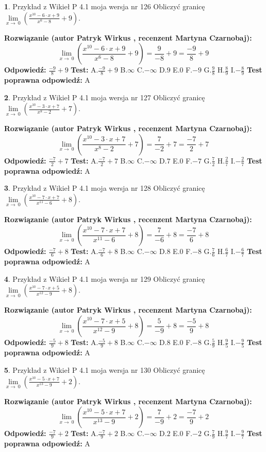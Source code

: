 \documentclass[12pt, a4paper]{article}
\theoremstyle{definition} %
\newtheorem{zad}{}
\newcommand{\zadStart}[1]{\begin{zad}#1\newline}
\newcommand{\zadStop}{\end{zad}}
\newcommand{\rozwStart}[2]{\noindent \textbf{Rozwiązanie (autor #1 , recenzent #2): }\newline}
\newcommand{\rozwStop}{\newline}
\newcommand{\odpStart}{\noindent \textbf{Odpowiedź:}\newline}
\newcommand{\odpStop}{\newline}
\newcommand{\testStart}{\noindent \textbf{Test:}\newline}
\newcommand{\testStop}{\newline}
\newcommand{\kluczStart}{\noindent \textbf{Test poprawna odpowiedź:}\newline}
\newcommand{\kluczStop}{\newline}
\begin{document}
\zadStart{Przykład z Wikieł P 4.1 moja wersja nr 126}
Obliczyć granicę $\lim\limits_{x\to\ 0}(\frac{x^{10}-6 \cdot x +9}{x^{6}-8}+9)$.
\zadStop
\rozwStart{Patryk Wirkus}{Martyna Czarnobaj}
$$\lim\limits_{x\to\ 0}(\frac{x^{10}-6 \cdot x +9}{x^{6}-8}+9)=\frac{9}{-8}+9=\frac{-9}{8}+9$$
\rozwStop
\odpStart
$\frac{-9}{8}+9$
\odpStop
\testStart
A.$\frac{-9}{8}+9$
B.$\infty$
C.$-\infty$
D.$9$
E.$0$
F.$-9$
G.$\frac{9}{8}$
H.$\frac{8}{9}$
I.$-\frac{8}{9}$
\testStop
\kluczStart
A
\kluczStop



\zadStart{Przykład z Wikieł P 4.1 moja wersja nr 127}
Obliczyć granicę $\lim\limits_{x\to\ 0}(\frac{x^{10}-3 \cdot x +7}{x^{8}-2}+7)$.
\zadStop
\rozwStart{Patryk Wirkus}{Martyna Czarnobaj}
$$\lim\limits_{x\to\ 0}(\frac{x^{10}-3 \cdot x +7}{x^{8}-2}+7)=\frac{7}{-2}+7=\frac{-7}{2}+7$$
\rozwStop
\odpStart
$\frac{-7}{2}+7$
\odpStop
\testStart
A.$\frac{-7}{2}+7$
B.$\infty$
C.$-\infty$
D.$7$
E.$0$
F.$-7$
G.$\frac{7}{2}$
H.$\frac{2}{7}$
I.$-\frac{2}{7}$
\testStop
\kluczStart
A
\kluczStop



\zadStart{Przykład z Wikieł P 4.1 moja wersja nr 128}
Obliczyć granicę $\lim\limits_{x\to\ 0}(\frac{x^{10}-7 \cdot x +7}{x^{11}-6}+8)$.
\zadStop
\rozwStart{Patryk Wirkus}{Martyna Czarnobaj}
$$\lim\limits_{x\to\ 0}(\frac{x^{10}-7 \cdot x +7}{x^{11}-6}+8)=\frac{7}{-6}+8=\frac{-7}{6}+8$$
\rozwStop
\odpStart
$\frac{-7}{6}+8$
\odpStop
\testStart
A.$\frac{-7}{6}+8$
B.$\infty$
C.$-\infty$
D.$8$
E.$0$
F.$-8$
G.$\frac{7}{6}$
H.$\frac{6}{7}$
I.$-\frac{6}{7}$
\testStop
\kluczStart
A
\kluczStop



\zadStart{Przykład z Wikieł P 4.1 moja wersja nr 129}
Obliczyć granicę $\lim\limits_{x\to\ 0}(\frac{x^{10}-7 \cdot x +5}{x^{12}-9}+8)$.
\zadStop
\rozwStart{Patryk Wirkus}{Martyna Czarnobaj}
$$\lim\limits_{x\to\ 0}(\frac{x^{10}-7 \cdot x +5}{x^{12}-9}+8)=\frac{5}{-9}+8=\frac{-5}{9}+8$$
\rozwStop
\odpStart
$\frac{-5}{9}+8$
\odpStop
\testStart
A.$\frac{-5}{9}+8$
B.$\infty$
C.$-\infty$
D.$8$
E.$0$
F.$-8$
G.$\frac{5}{9}$
H.$\frac{9}{5}$
I.$-\frac{9}{5}$
\testStop
\kluczStart
A
\kluczStop



\zadStart{Przykład z Wikieł P 4.1 moja wersja nr 130}
Obliczyć granicę $\lim\limits_{x\to\ 0}(\frac{x^{10}-5 \cdot x +7}{x^{13}-9}+2)$.
\zadStop
\rozwStart{Patryk Wirkus}{Martyna Czarnobaj}
$$\lim\limits_{x\to\ 0}(\frac{x^{10}-5 \cdot x +7}{x^{13}-9}+2)=\frac{7}{-9}+2=\frac{-7}{9}+2$$
\rozwStop
\odpStart
$\frac{-7}{9}+2$
\odpStop
\testStart
A.$\frac{-7}{9}+2$
B.$\infty$
C.$-\infty$
D.$2$
E.$0$
F.$-2$
G.$\frac{7}{9}$
H.$\frac{9}{7}$
I.$-\frac{9}{7}$
\testStop
\kluczStart
A
\kluczStop
\end{document}
